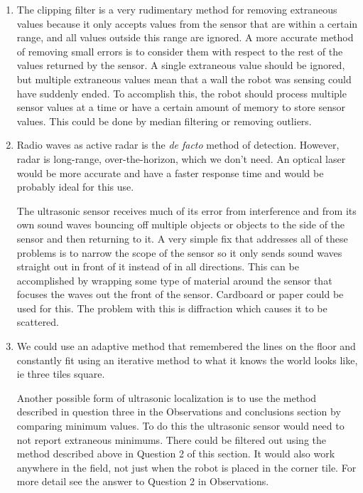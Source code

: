 \documentclass[twocolumn]{article}
\begin{document}
\begin{enumerate}

\item
The clipping filter is a very rudimentary method for removing extraneous values because it only accepts values from the sensor that are within a certain range, and all values outside this range are ignored. A more accurate method of removing small errors is to consider them with respect to the rest of the values returned by the sensor. A single extraneous value should be ignored, but multiple extraneous values mean that a wall the robot was sensing could have suddenly ended. To accomplish this, the robot should process multiple sensor values at a time or have a certain amount of memory to store sensor values. This could be done by median filtering or removing outliers.

\item
Radio waves as active radar is the {\it de facto} method of detection.
However, radar is long-range, over-the-horizon, which we don't need.
An optical laser would be more accurate and have a faster response time and would be probably ideal for this use.

The ultrasonic sensor receives much of its error from interference and from its own sound waves bouncing off multiple objects or objects to the side of the sensor and then returning to it. A very simple fix that addresses all of these problems is to narrow the scope of the sensor so it only sends sound waves straight out in front of it instead of in all directions. This can be accomplished by wrapping some type of material around the sensor that focuses the waves out the front of the sensor. Cardboard or paper could be used for this. The problem with this is diffraction\cite{morse1948vibration} which causes it to be scattered.

\item
We could use an adaptive method that remembered the lines on the floor and constantly fit using an iterative method to what it knows the world looks like, ie three tiles square.

Another possible form of ultrasonic localization is to use the method described in question three in the Observations and conclusions section by comparing minimum values. To do this the ultrasonic sensor would need to not report extraneous minimums. There could be filtered out using the method described above in Question 2 of this section. It would also work anywhere in the field, not just when the robot is placed in the corner tile. For more detail see the answer to Question 2 in Observations.

\end{enumerate}


\end{document}
